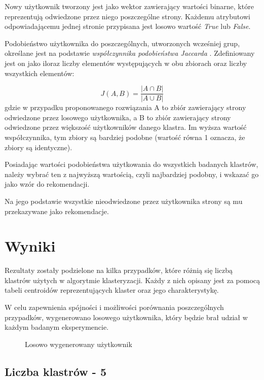 \documentclass{classrep}
\begin{document}
Nowy użytkownik tworzony jest jako wektor zawierający wartości binarne, które reprezentują odwiedzone przez niego poszczególne strony. Każdemu atrybutowi odpowiadającemu jednej stronie przypisana jest losowo wartość \emph{True} lub \emph{False}.

Podobieństwo użytkownika do poszczególnych, utworzonych wcześniej grup,  określane jest na podstawie \emph{współczynnika podobieństwa Jaccarda} \cite{Sim}. Zdefiniowany jest on jako iloraz liczby elementów występujących w obu zbiorach oraz liczby wszystkich elementów:

\[J(A, B) = \frac{|A \cap B|}{|A \cup B|}\]
gdzie w przypadku proponowanego rozwiązania A to zbiór zawierający strony odwiedzone przez losowego użytkownika, a  B to zbiór zawierający strony odwiedzone przez większość użytkowników danego klastra. Im wyższa wartość współczynnika, tym zbiory są bardziej podobne (wartość równa 1 oznacza, że zbiory są identyczne). 

Posiadając wartości podobieństwa użytkowania do wszystkich badanych klastrów, należy wybrać ten z najwyższą wartością, czyli najbardziej podobny, i wskazać go jako wzór do rekomendacji.

Na jego podstawie wszystkie nieodwiedzone przez użytkownika strony są mu przekazywane jako rekomendacje.


\newpage
\section{Wyniki}    
Rezultaty zostały podzielone na kilka przypadków, które różnią się liczbą klastrów użytych w algorytmie klasteryzacji. Każdy z nich opisany jest za pomocą tabeli centroidów reprezentujących klaster oraz jego charakterystykę. 

W celu zapewnienia spójności i możliwości porównania poszczególnych przypadków, wygenerowano losowego użytkownika, który będzie brał udział w każdym badanym eksperymencie. 
\begin{figure}[H] 
	\begin{center}
    \caption{Losowo wygenerowany użytkownik}
    \label{StringToNominal_conf}
	\end{center}
\end{figure}


\newpage
\subsection{Liczba klastrów - 5}
\end{document}
